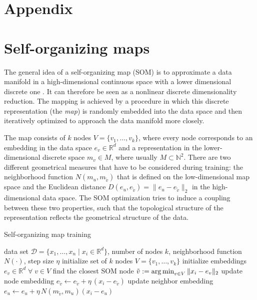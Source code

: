 \newpage

\appendix

\section*{Appendix}

\section{Self-organizing maps}\label{sec:SOMs}

The general idea of a self-organizing map (SOM) is to approximate a data manifold in a high-dimensional continuous space with a lower dimensional discrete one \citep{Kohonen1998}.
It can therefore be seen as a nonlinear discrete dimensionality reduction.
The mapping is achieved by a procedure in which this discrete representation (the \emph{map}) is randomly embedded into the data space and then iteratively optimized to approach the data manifold more closely.

The map consists of $k$ nodes $V=\{v_1, \dots , v_k\}$, where every node corresponds to an embedding in the data space $e_v \in \mathbb{R}^d$ and a representation in the lower-dimensional discrete space $m_v \in M$, where usually $M \subset \mathbb{N}^2$.
There are two different geometrical measures that have to be considered during training: the neighborhood function $N(m_u, m_{\tilde{v}})$ that is defined on the low-dimensional map space and the Euclidean distance $D (e_u, e_{\tilde{v}}) = \| e_u - e_{\tilde{v}} \|_2$ in the high-dimensional data space.
The SOM optimization tries to induce a coupling between these two properties, such that the topological structure of the representation reflects the geometrical structure of the data.


\begin{algorithm}
\caption{Self-organizing map training}
\label{alg:som_train}

\begin{algorithmic}
	\Require data set $\mathcal{D} = \{x_1, \dots ,x_n \; \vert \; x_i \in \mathbb{R}^d\}$, number of nodes $k$, neighborhood function $N(\cdot)$, step size $\eta$
	\State initialize set of $k$ nodes $V=\{v_1, \dots , v_k\}$
	\State initialize embeddings $e_v \in \mathbb{R}^d \; \forall \; v \in V$
		\State find the closest SOM node $\tilde{v} := \operatorname*{arg\,min}_{v \in V} \| x_i - e_v \|_2$
		\State update node embedding $e_{\tilde{v}} \gets e_{\tilde{v}} + \eta \, (x_i - e_{\tilde{v}})$
			\State update neighbor embedding $e_u \gets e_u + \eta \, N(m_{\tilde{v}}, m_u) (x_i - e_u)$
		\EndFor
	\EndFor
	\EndWhile
\end{algorithmic}
	
\end{algorithm}

